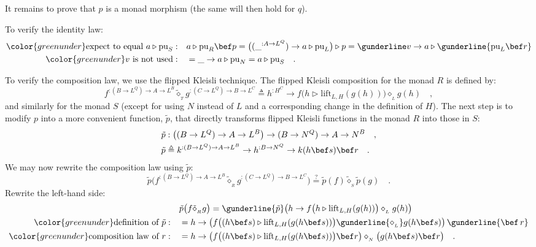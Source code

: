 It remains to prove that $p$ is a monad morphism (the same will then
hold for $q$).

To verify the identity law:
\begin{align*}
{\color{greenunder}\text{expect to equal }a\triangleright\text{pu}_{S}:}\quad & a\triangleright\text{pu}_{R}\bef p=\big((\_^{:A\rightarrow L^{Q}})\rightarrow a\triangleright\text{pu}_{L}\big)\triangleright p=\gunderline v\rightarrow a\triangleright\gunderline{\text{pu}_{L}\bef r}\\
{\color{greenunder}v\text{ is not used}:}\quad & =\_\rightarrow a\triangleright\text{pu}_{N}=a\triangleright\text{pu}_{S}\quad.
\end{align*}

To verify the composition law, we use the flipped Kleisli
technique. The flipped Kleisli composition for the monad $R$ is defined
by:
\[
f^{:(B\rightarrow L^{Q})\rightarrow A\rightarrow L^{B}}\tilde{\diamond}_{_{T}}g^{:(C\rightarrow L^{Q})\rightarrow B\rightarrow L^{C}}\triangleq h^{:H^{C}}\rightarrow f\big(h\triangleright\text{lift}_{L,H}(g(h))\big)\diamond_{_{L}}g(h)\quad,
\]
and similarly for the monad $S$ (except for using $N$ instead of
$L$ and a corresponding change in the definition of $H$). The next
step is to modify $p$ into a more convenient function, $\tilde{p}$,
that directly transforms flipped Kleisli functions in the monad $R$
into those in $S$:
\begin{align*}
 & \tilde{p}:\big((B\rightarrow L^{Q})\rightarrow A\rightarrow L^{B}\big)\rightarrow(B\rightarrow N^{Q})\rightarrow A\rightarrow N^{B}\quad,\\
 & \tilde{p}\triangleq k^{:(B\rightarrow L^{Q})\rightarrow A\rightarrow L^{B}}\rightarrow h^{:B\rightarrow N^{Q}}\rightarrow k(h\bef s)\bef r\quad.
\end{align*}
We may now rewrite the composition law using $\tilde{p}$:
\[
\tilde{p}\big(f^{:(B\rightarrow L^{Q})\rightarrow A\rightarrow L^{B}}\tilde{\diamond}_{_{R}}g^{:(C\rightarrow L^{Q})\rightarrow B\rightarrow L^{C}}\big)\overset{?}{=}\tilde{p}(f)\tilde{\diamond}_{_{S}}\tilde{p}(g)\quad.
\]
Rewrite the left-hand side:
\begin{align*}
 & \tilde{p}\big(f\tilde{\diamond}_{_{R}}g\big)=\gunderline{\tilde{p}}\big(h\rightarrow f\big(h\triangleright\text{lift}_{L,H}(g(h))\big)\diamond_{_{L}}g(h)\big)\\
{\color{greenunder}\text{definition of }\tilde{p}:}\quad & =h\rightarrow\big(f\big((h\bef s)\triangleright\text{lift}_{L,H}(g(h\bef s))\big)\gunderline{\diamond_{_{L}}}g(h\bef s)\big)\,\gunderline{\bef\,r}\\
{\color{greenunder}\text{composition law of }r:}\quad & =h\rightarrow\big(f\big((h\bef s)\triangleright\text{lift}_{L,H}(g(h\bef s))\big)\bef r\big)\diamond_{_{N}}\big(g(h\bef s)\bef r\big)\quad.
\end{align*}
